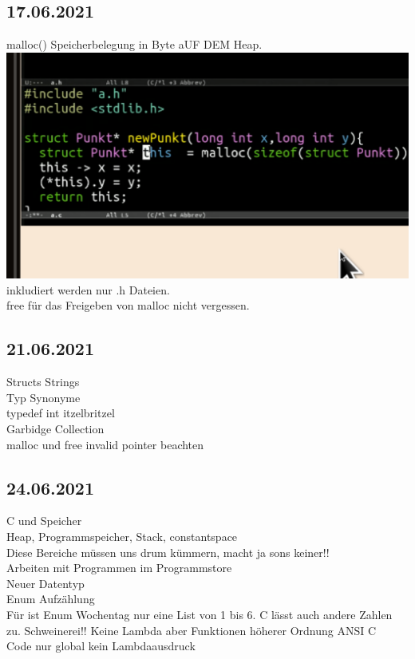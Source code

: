 \documentclass[paper=A4]{article}
\begin{document}
 	\subsection*{17.06.2021}
 	malloc() Speicherbelegung in Byte aUF DEM Heap. \\
 	\includegraphics[width=\linewidth]{ckonsample} \\
 	inkludiert werden nur .h Dateien. \\
 	free für das Freigeben von malloc nicht vergessen. \\
 	\subsection*{21.06.2021}
 	Structs Strings \\
 	Typ Synonyme \\
 	typedef int itzelbritzel \\
 	Garbidge Collection \\
 	malloc und free invalid pointer beachten \\
 	\subsection*{24.06.2021}
 	C und Speicher \\
 	Heap, Programmspeicher, Stack, constantspace \\
 	Diese Bereiche müssen uns drum kümmern, macht ja sons keiner!! \\
 	Arbeiten mit Programmen im Programmstore \\
 	Neuer Datentyp \\
 	Enum Aufzählung \\
 	Für ist Enum Wochentag nur eine List von 1 bis 6. C lässt auch andere Zahlen zu. Schweinerei!!
 	Keine Lambda aber Funktionen höherer Ordnung
 	ANSI C \\
 	Code nur global kein Lambdaausdruck \\
\end{document}
